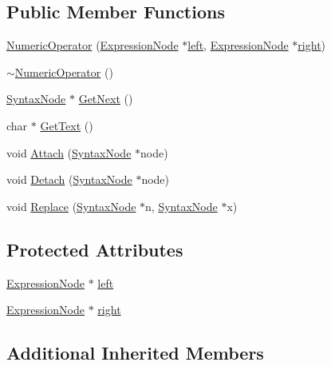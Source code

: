 \subsection*{Public Member Functions}
\begin{DoxyCompactItemize}
\item 
\hyperlink{classNumericOperator_a49cd2230b867cdfca64715aaf6e37561}{Numeric\+Operator} (\hyperlink{classExpressionNode}{Expression\+Node} $\ast$\hyperlink{classNumericOperator_a55da3c4075408deff978711030fa8258}{left}, \hyperlink{classExpressionNode}{Expression\+Node} $\ast$\hyperlink{classNumericOperator_aa2c5b5bea59bbb068bc6013bc5cac483}{right})
\item 
\hyperlink{classNumericOperator_a230eb1128573672e1c5651bbf67ef16a}{$\sim$\+Numeric\+Operator} ()
\item 
\hyperlink{classSyntaxNode}{Syntax\+Node} $\ast$ \hyperlink{classNumericOperator_a008152aaef6931b7dd70d8fa4be9f7f6}{Get\+Next} ()
\item 
char $\ast$ \hyperlink{classNumericOperator_aaeef2885eb34d240cef0f55593354805}{Get\+Text} ()
\item 
void \hyperlink{classNumericOperator_ab40d02625fde750d08168ca2ef46c432}{Attach} (\hyperlink{classSyntaxNode}{Syntax\+Node} $\ast$node)
\item 
void \hyperlink{classNumericOperator_aacbe002fae709804679443e7fe8f2d36}{Detach} (\hyperlink{classSyntaxNode}{Syntax\+Node} $\ast$node)
\item 
void \hyperlink{classNumericOperator_ad8f69aec49e9a900ca592dbf972df619}{Replace} (\hyperlink{classSyntaxNode}{Syntax\+Node} $\ast$n, \hyperlink{classSyntaxNode}{Syntax\+Node} $\ast$x)
\end{DoxyCompactItemize}
\subsection*{Protected Attributes}
\begin{DoxyCompactItemize}
\item 
\hyperlink{classExpressionNode}{Expression\+Node} $\ast$ \hyperlink{classNumericOperator_a55da3c4075408deff978711030fa8258}{left}
\item 
\hyperlink{classExpressionNode}{Expression\+Node} $\ast$ \hyperlink{classNumericOperator_aa2c5b5bea59bbb068bc6013bc5cac483}{right}
\end{DoxyCompactItemize}
\subsection*{Additional Inherited Members}


